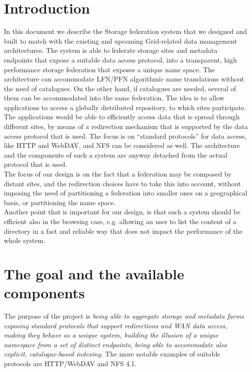 \documentclass[12pt]{article} %
\begin{document}
\section{Introduction}
In this document we describe the Storage federation system that we designed and built to match with the existing and upcoming Grid-related data management architectures.
The system is able to federate storage sites and metadata endpoints that expose a suitable data access protocol, into a transparent, high performance storage federation that exposes a unique name space. The architecture can accommodate LFN/PFN algorithmic name translations without the need of catalogues. On the other hand, if catalogues are needed, several of them can be accommodated into the same federation. The idea is to allow applications to access a globally distributed repository, to which sites participate. The applications would be able to efficiently access data that is spread through different sites, by means of a redirection mechanism that is supported by the data access protocol that is used. The focus is on “standard protocols” for data access, like HTTP and WebDAV, and NFS can be considered as well. The architecture and the components of such a system are anyway detached from the actual protocol that is used.\\
The focus of our design is on the fact that a federation may be composed by distant sites, and the redirection choices have to take this into account, without imposing the need of partitioning a federation into smaller ones on a geographical basis, or partitioning the name space.\\ Another point that is important for our design, is that such a system should be efficient also in the browsing case, e.g. allowing an user to list the content of a directory in a fast and reliable way that does not impact the performance of the whole system.





\section{The goal and the available components}

The purpose of the project is \textit{being able to aggregate storage and metadata farms exposing standard protocols that support redirections and WAN data access, making they behave as a unique system, building the illusion of a unique namespace from a set of distinct endpoints, being able to accommodate also explicit, catalogue-based indexing.} The more notable examples of suitable protocols are HTTP/WebDAV and NFS 4.1.
\end{document}

